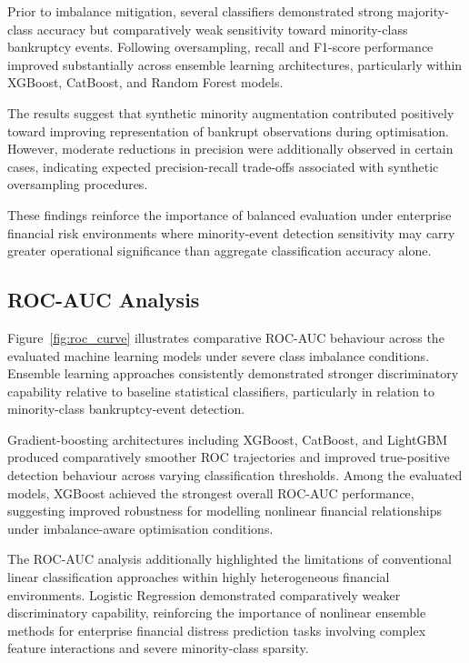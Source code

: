 \documentclass{article}
\begin{document}
Prior to imbalance mitigation, several classifiers demonstrated strong majority-class accuracy but comparatively weak sensitivity toward minority-class bankruptcy events. Following oversampling, recall and F1-score performance improved substantially across ensemble learning architectures, particularly within XGBoost, CatBoost, and Random Forest models.

The results suggest that synthetic minority augmentation contributed positively toward improving representation of bankrupt observations during optimisation. However, moderate reductions in precision were additionally observed in certain cases, indicating expected precision-recall trade-offs associated with synthetic oversampling procedures.

These findings reinforce the importance of balanced evaluation under enterprise financial risk environments where minority-event detection sensitivity may carry greater operational significance than aggregate classification accuracy alone.

\subsection{ROC-AUC Analysis}

Figure~\ref{fig:roc_curve} illustrates comparative ROC-AUC behaviour across the evaluated machine learning models under severe class imbalance conditions. Ensemble learning approaches consistently demonstrated stronger discriminatory capability relative to baseline statistical classifiers, particularly in relation to minority-class bankruptcy-event detection.

Gradient-boosting architectures including XGBoost, CatBoost, and LightGBM produced comparatively smoother ROC trajectories and improved true-positive detection behaviour across varying classification thresholds. Among the evaluated models, XGBoost achieved the strongest overall ROC-AUC performance, suggesting improved robustness for modelling nonlinear financial relationships under imbalance-aware optimisation conditions.

The ROC-AUC analysis additionally highlighted the limitations of conventional linear classification approaches within highly heterogeneous financial environments. Logistic Regression demonstrated comparatively weaker discriminatory capability, reinforcing the importance of nonlinear ensemble methods for enterprise financial distress prediction tasks involving complex feature interactions and severe minority-class sparsity.
\end{document}
